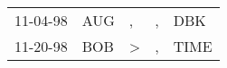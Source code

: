 \begin{supertabular}{p{0.07\textwidth}p{0.06\textwidth}p{0.02\textwidth}p{0.02\textwidth}p{0.06\textwidth}}
 11-04-98\textsuperscript{} &  AUG\textsuperscript{} &             , &  , &   DBK\textsuperscript{} \\
 11-20-98\textsuperscript{} &  BOB\textsuperscript{} &  \textgreater &  , &  TIME\textsuperscript{} \\
\end{supertabular}
